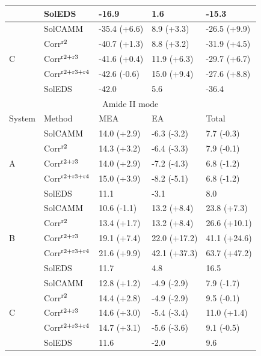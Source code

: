 \documentclass[a4paper,titlepage,twoside,fleqn,12pt]{book}
\begin{document}
\begin{appendices}
\begin{table}[ht]
\begin{tabular*}{1.0\textwidth}{@{\extracolsep{\fill} } l ll ll}
                     & SolEDS    & -16.9         & 1.6        & -15.3        \\
\hline
\multirow{5}{*}{C}   & SolCAMM   & -35.4 (+6.6)  & 8.9 (+3.3) & -26.5 (+9.9) \\
        & Corr$^{\rm r2}$        & -40.7 (+1.3)  & 8.8 (+3.2) & -31.9 (+4.5) \\
        & Corr$^{\rm r2+r3}$     & -41.6 (+0.4)  &11.9 (+6.3) & -29.7 (+6.7) \\
        & Corr$^{\rm r2+r3+r4}$  & -42.6 (-0.6)  &15.0 (+9.4) & -27.6 (+8.8) \\
                     & SolEDS    & -42.0         & 5.6        & -36.4        \\
\hline\hline
\multicolumn{5}{c}{Amide II mode} \\
\hline
System               & Method    & MEA           & EA         & Total        \\
\hline
\multirow{5}{*}{A}   & SolCAMM   & 14.0 (+2.9)   & -6.3 (-3.2)& 7.7 (-0.3)   \\
        & Corr$^{\rm r2}$        & 14.3 (+3.2)   & -6.4 (-3.3)& 7.9 (-0.1)   \\
        & Corr$^{\rm r2+r3}$     & 14.0 (+2.9)   & -7.2 (-4.3)& 6.8 (-1.2)   \\
        & Corr$^{\rm r2+r3+r4}$  & 15.0 (+3.9)   & -8.2 (-5.1)& 6.8 (-1.2)   \\
                     & SolEDS    & 11.1          & -3.1       & 8.0          \\
\hline
\multirow{5}{*}{B}   & SolCAMM   & 10.6 (-1.1)   & 13.2 (+8.4)& 23.8 (+7.3)  \\
        & Corr$^{\rm r2}$        & 13.4 (+1.7)   & 13.2 (+8.4)& 26.6 (+10.1) \\
        & Corr$^{\rm r2+r3}$     & 19.1 (+7.4)   & 22.0 (+17.2)&41.1 (+24.6) \\
        & Corr$^{\rm r2+r3+r4}$  & 21.6 (+9.9)   & 42.1 (+37.3)&63.7 (+47.2) \\
                     & SolEDS    & 11.7          & 4.8        & 16.5         \\
\hline
\multirow{5}{*}{C}   & SolCAMM   & 12.8 (+1.2)   & -4.9 (-2.9)& 7.9 (-1.7)   \\
        & Corr$^{\rm r2}$        & 14.4 (+2.8)   & -4.9 (-2.9)& 9.5 (-0.1)   \\
        & Corr$^{\rm r2+r3}$     & 14.6 (+3.0)   & -5.4 (-3.4)&11.0 (+1.4)   \\
        & Corr$^{\rm r2+r3+r4}$  & 14.7 (+3.1)   & -5.6 (-3.6)& 9.1 (-0.5)   \\
                     & SolEDS    & 11.6          & -2.0       & 9.6          \\
\hline\hline
\end{tabular*}
\end{table}



\end{appendices}
\end{document}
